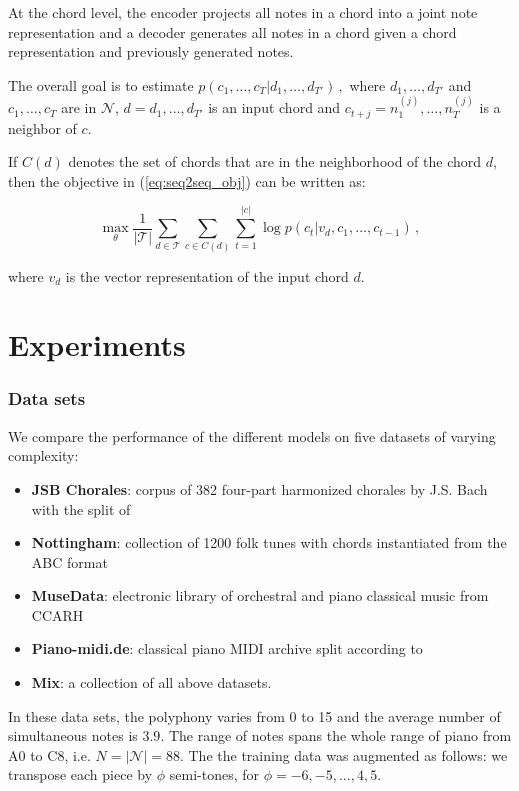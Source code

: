 \documentclass[12pt]{article}\pagestyle{myheadings}
\newcommand{\N}{\mathcal{N}}
\newcommand{\T}{\mathcal{T}}
\begin{document}
At the chord level, the encoder projects all notes in a chord into a joint note representation and a decoder generates all notes in a chord given a chord representation and previously generated notes.
 

The overall goal is to estimate
$
p(c_1, \ldots, c_T | d_1,\ldots,d_{T'})\,,
$
where  $d_1, \ldots, d_{T'}$ and $c_1, \ldots, c_T$ are in $\N$, $d = d_1, \ldots, d_{T'}$ is an input chord and $c_{t+j} =n^{(j)}_1, \ldots, n^{(j)}_T$ is a neighbor of $c$.

If $C(d)$ denotes the set of chords that are in the neighborhood of the chord $d$, then the objective in (\ref{eq:seq2seq_obj}) can be written as:

\begin{equation}
\max_{\theta} \frac{1}{|\T|} \sum_{d \in \T} \sum_{c\in C(d)} \sum_{t=1}^{|c|} \log p(c_t | v_d, c_1, \ldots, c_{t-1})  \,,
\label{eq:c2c_obj}
\end{equation}

where $v_d$ is the vector representation of the input chord $d$. 

\section*{Experiments }

\subsubsection*{Data sets}
We compare the performance of the different models on five datasets of varying complexity:

\begin{itemize}
\item[] \textbf{JSB Chorales}: corpus of 382 four-part harmonized chorales by J.S. Bach with the split of  \citet{allan2005harmonising}
\item[] \textbf{Nottingham}: collection of 1200 folk tunes with chords instantiated from the ABC format
\item[] \textbf{MuseData}: electronic library of orchestral and piano classical music from CCARH
\item[] \textbf{Piano-midi.de}: classical piano MIDI archive split according to \citet{poliner2007discriminative}
\item[] \textbf{Mix}: a collection of all above datasets.
\end{itemize}

\noindent In these data sets, the polyphony varies from 0 to 15 and the average number of simultaneous notes is $3.9$. The range of notes spans the whole range of piano from A0 to C8, i.e. $N = |\N| = 88$.
The the training data was augmented as follows: we transpose each piece by $\phi$ semi-tones, for $\phi = -6, -5, . . . , 4, 5.$
\\
\end{document}
